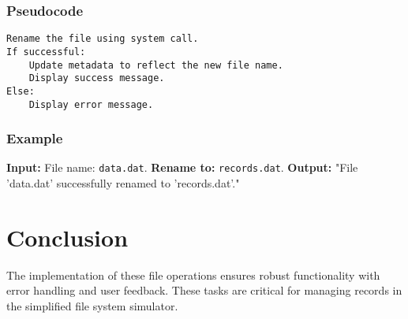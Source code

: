 \documentclass[a4paper, 12pt]{article}
\begin{document}
\subsubsection*{Pseudocode}
\begin{verbatim}
Rename the file using system call.
If successful:
    Update metadata to reflect the new file name.
    Display success message.
Else:
    Display error message.
\end{verbatim}

\subsubsection*{Example}
\textbf{Input:} File name: \texttt{data.dat}.\newline
\textbf{Rename to:} \texttt{records.dat}.\newline
\textbf{Output:} "File 'data.dat' successfully renamed to 'records.dat'."

\section*{Conclusion}
The implementation of these file operations ensures robust functionality with error handling and user feedback. These tasks are critical for managing records in the simplified file system simulator.
\end{document}
